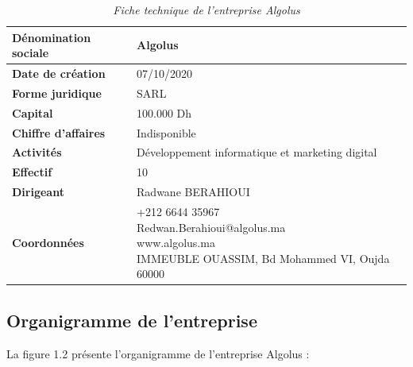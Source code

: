 \documentclass[12pt,a4paper]{report}
\begin{document}
	\begin{table}[htbp]
		\centering
		\caption{\textit{Fiche technique de l'entreprise Algolus}}
		\begin{tabular}{|l|l|}
			\hline
			\textbf{Dénomination sociale} & Algolus \\
			\hline
			\textbf{Date de création} & 07/10/2020 \\
			\hline
			\textbf{Forme juridique} & SARL \\
			\hline
			\textbf{Capital} & 100.000 Dh \\
			\hline
			\textbf{Chiffre d'affaires} & Indisponible \\
			\hline
			\textbf{Activités} & Développement informatique et marketing digital \\
			\hline
			\textbf{Effectif} & 10 \\
			\hline
			\textbf{Dirigeant} & Radwane BERAHIOUI \\
			\hline
			\textbf{Coordonnées} & \makecell[l]{+212 6644 35967 \\ Redwan.Berahioui@algolus.ma \\ www.algolus.ma \\ IMMEUBLE OUASSIM, Bd Mohammed VI, Oujda 60000} \\
			\hline
		\end{tabular}
		\label{tab:fiche-technique-algolus}  %
	\end{table}
	
	\subsection{Organigramme de l’entreprise}
	
	La figure 1.2 présente l'organigramme de l'entreprise Algolus :
	
\end{document}
